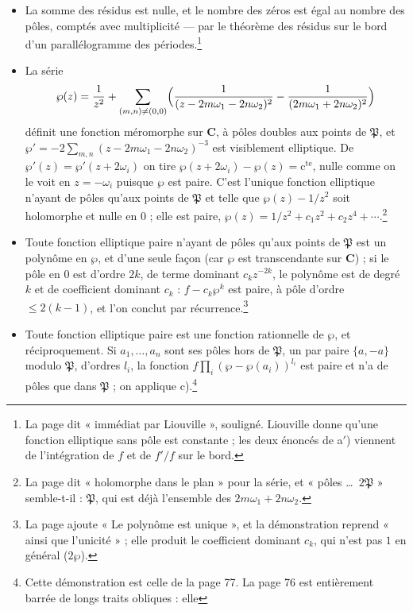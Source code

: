 \documentclass[11pt,a4paper]{article}
\begin{document}
\begin{itemize}
\item[a$'$)] La somme des résidus est nulle, et le nombre des zéros est égal au
nombre des pôles, comptés avec multiplicité --- par le théorème des résidus sur
le bord d'un parallélogramme des périodes.\footnote{La page dit « immédiat par
Liouville », souligné. Liouville donne qu'une fonction elliptique sans pôle est
constante ; les deux énoncés de a$'$) viennent de l'intégration de $f$ et de
$f'/f$ sur le bord.}
\item[b)] La série
\[
\wp(z) = \frac{1}{z^2} + \sum_{(m,n) \neq (0,0)}\Bigl(\frac{1}{(z - 2m\omega_1 -
2n\omega_2)^2} - \frac{1}{(2m\omega_1 + 2n\omega_2)^2}\Bigr)
\]
définit une fonction méromorphe sur $\mathbf{C}$, à pôles doubles aux points
de $\mathfrak{P}$, et $\wp' = -2\sum_{m,n}(z - 2m\omega_1 - 2n\omega_2)^{-3}$ est
visiblement elliptique. De $\wp'(z) = \wp'(z + 2\omega_i)$ on tire $\wp(z + 2\omega_i)
- \wp(z) = \text{c}^{\text{te}}$, nulle comme on le voit en $z = -\omega_i$
puisque $\wp$ est paire. C'est l'unique fonction elliptique n'ayant de pôles
qu'aux points de $\mathfrak{P}$ et telle que $\wp(z) - 1/z^2$ soit holomorphe
et nulle en $0$ ; elle est paire, $\wp(z) = 1/z^2 + c_1z^2 + c_2z^4 +
\cdots$.\footnote{La page dit « holomorphe dans le plan » pour la série, et
« pôles \ldots\ $2\mathfrak{P}$ » semble-t-il : $\mathfrak{P}$, qui est déjà
l'ensemble des $2m\omega_1 + 2n\omega_2$.}
\item[c)] Toute fonction elliptique paire n'ayant de pôles qu'aux points de
$\mathfrak{P}$ est un polynôme en $\wp$, et d'une seule façon (car $\wp$ est
transcendante sur $\mathbf{C}$) ; si le pôle en $0$ est d'ordre $2k$, de terme
dominant $c_k z^{-2k}$, le polynôme est de degré $k$ et de coefficient dominant
$c_k$ : $f - c_k\wp^k$ est paire, à pôle d'ordre $\leqslant 2(k-1)$, et l'on
conclut par récurrence.\footnote{La page ajoute « Le polynôme est unique », et la démonstration reprend « ainsi que l'unicité » ; elle produit le coefficient dominant $c_k$, qui n'est pas $1$ en général ($2\wp$).}
\item[d)] Toute fonction elliptique paire est une fonction rationnelle de
$\wp$, et réciproquement. Si $a_1, \ldots, a_n$ sont ses pôles hors de
$\mathfrak{P}$, un par paire $\{a, -a\}$ modulo $\mathfrak{P}$, d'ordres $l_i$,
la fonction $f\prod_i(\wp - \wp(a_i))^{l_i}$ est paire et n'a de pôles que dans
$\mathfrak{P}$ ; on applique c).\footnote{Cette démonstration est celle de la
page 77. La page 76 est entièrement barrée de longs traits obliques : elle
}
\end{itemize}
\end{document}
